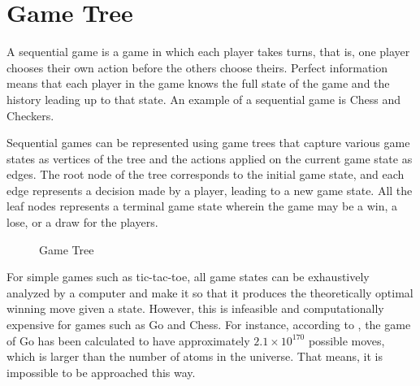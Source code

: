 \section{Game Tree}

A sequential game is a game in which each player takes turns, that is, one player chooses their own action before the others choose theirs. Perfect information means that each player in the game knows the full state of the game and the history leading up to that state. An example of a sequential game is Chess and Checkers.

Sequential games can be represented using game trees that capture various game states as vertices of the tree and the actions applied on the current game state as edges. The root node of the tree corresponds to the initial game state, and each edge represents a decision made by a player, leading to a new game state. All the leaf nodes represents a terminal game state wherein the game may be a win, a lose, or a draw for the players.

\begin{figure}[htb]
    \centering
    \caption{Game Tree}
    \label{fig:game-tree}
\end{figure}

For simple games such as tic-tac-toe, all game states can be exhaustively analyzed by a computer and make it so that it produces the theoretically optimal winning move given a state. However, this is infeasible and computationally expensive for games such as Go and Chess. For instance, according to  \cite{jontromp}, the game of Go has been calculated to have approximately $2.1 \times 10^{170}$ possible moves, which is larger than the number of atoms in the universe. That means, it is  impossible to be approached this way. %

